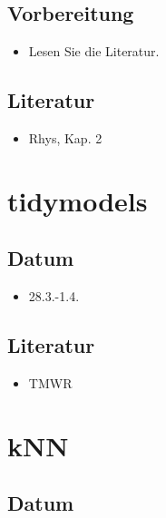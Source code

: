 \documentclass[
]{book}
\providecommand{\tightlist}{%
  \setlength{\itemsep}{0pt}\setlength{\parskip}{0pt}}
\begin{document}
\hypertarget{vorbereitung-1}{%
\subsection{Vorbereitung}\label{vorbereitung-1}}

\begin{itemize}
\tightlist
\item
  Lesen Sie die Literatur.
\end{itemize}

\hypertarget{literatur-2}{%
\subsection{Literatur}\label{literatur-2}}

\begin{itemize}
\tightlist
\item
  Rhys, Kap. 2
\end{itemize}

\hypertarget{tidymodels}{%
\section{tidymodels}\label{tidymodels}}

\hypertarget{datum-2}{%
\subsection{Datum}\label{datum-2}}

\begin{itemize}
\tightlist
\item
  28.3.-1.4.
\end{itemize}

\hypertarget{literatur-3}{%
\subsection{Literatur}\label{literatur-3}}

\begin{itemize}
\tightlist
\item
  TMWR
\end{itemize}

\hypertarget{knn}{%
\section{kNN}\label{knn}}

\hypertarget{datum-3}{%
\subsection{Datum}\label{datum-3}}
\end{document}
